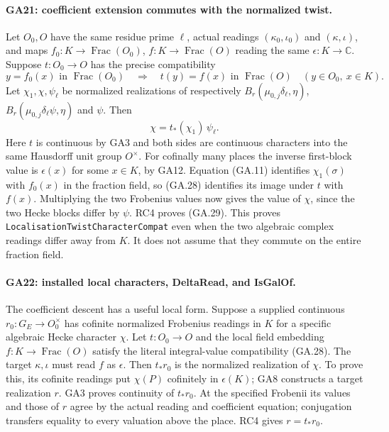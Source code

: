\paragraph{GA21: coefficient extension commutes with the normalized twist.}
Let $O_0,O$ have the same residue prime $\ell$, actual
readings $(\kappa_0,\iota_0)$ and $(\kappa,\iota)$,
and maps $f_0:K\to\operatorname{Frac}(O_0)$,
$f:K\to\operatorname{Frac}(O)$ reading the same
$\epsilon:K\to\mathbb C$. Suppose
$t:O_0\to O$ has the precise compatibility
\[
 y=f_0(x)\text{ in }\operatorname{Frac}(O_0)
       \quad\Longrightarrow\quad t(y)=f(x)
            \text{ in }\operatorname{Frac}(O)
 \quad(y\in O_0,\ x\in K).                             \tag{GA.28}
\]
Let $\chi_1,\chi,\psi_\ell$ be normalized realizations
of respectively $B_r(\mu_{0,j}\delta_\ell,\eta)$,
$B_r(\mu_{0,j}\delta_\ell\psi,\eta)$ and $\psi$.
Then
\[
                 \chi=t_*(\chi_1)\,\psi_\ell.           \tag{GA.29}
\]
Here $t$ is continuous by GA3 and both sides are continuous
characters into the same Hausdorff unit group $O^\times$.
For cofinally many places the inverse first-block value
is $\epsilon(x)$ for some $x\in K$, by GA12.
Equation (GA.11) identifies $\chi_1(\sigma)$ with
$f_0(x)$ in the fraction field, so (GA.28) identifies
its image under $t$ with $f(x)$.
Multiplying the two Frobenius values now gives the value
of $\chi$, since the two Hecke blocks differ by $\psi$.
RC4 proves (GA.29). This proves
\texttt{LocalisationTwistCharacterCompat} even when
the two algebraic complex readings differ away from $K$.
It does not assume that they commute on the entire
fraction field.

\paragraph{GA22: installed local characters, DeltaRead, and IsGalOf.}
The coefficient descent has a useful local form. Suppose
a supplied continuous $r_0:G_E\to O_0^\times$ has
cofinite normalized Frobenius readings in $K$ for a
specific algebraic Hecke character $\chi$. Let
$t:O_0\to O$ and the local field embedding
$f:K\to\operatorname{Frac}(O)$ satisfy the literal
integral-value compatibility (GA.28).
The target $\kappa,\iota$ must read $f$ as $\epsilon$.
Then $t_*r_0$ is the normalized realization of $\chi$.
To prove this, its cofinite readings put $\chi(P)$
cofinitely in $\epsilon(K)$; GA8 constructs a target
realization $r$. GA3 proves continuity of $t_*r_0$.
At the specified Frobenii its values and those of $r$
agree by the actual reading and coefficient equation;
conjugation transfers equality to every valuation above
the place. RC4 gives $r=t_*r_0$.

